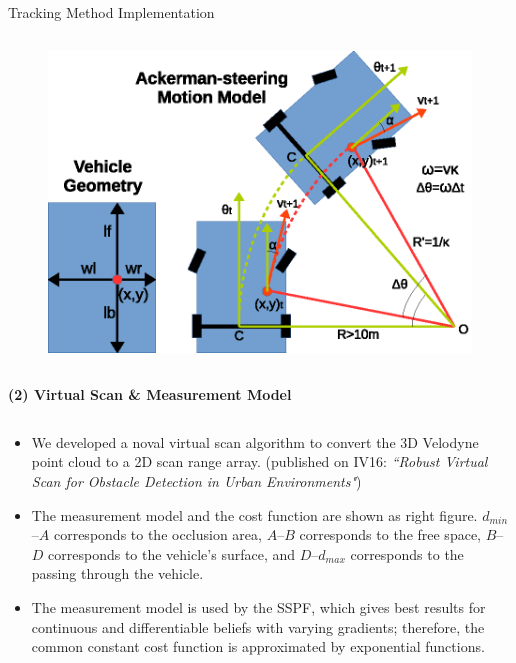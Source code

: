 \documentclass[final,hyperref={pdfpagelabels=false}]{beamer}
\begin{document}
\begin{frame}[t]
\begin{columns}[t]
\begin{column}{.48\textwidth}
\begin{block}{Tracking Method Implementation}
\begin{columns}[t]
\begin{column}{0.48\textwidth}
\begin{figure}
	 \includegraphics[width=\textwidth]{./img/geometry_ackerman}
	 \label{fig:geometry_ackerman}
	\end{figure}
	\end{column}
\end{columns}

\vspace{1em}
\begin{center}
\textbf{(2) Virtual Scan \& Measurement Model}
\end{center}
\begin{columns}[t]
	\begin{column}{0.53\textwidth}
		\begin{itemize}
			\item We developed a noval virtual scan algorithm to convert the 3D Velodyne point cloud to a 2D scan range array. (published on IV16: \textit{``Robust Virtual Scan for Obstacle Detection in Urban Environments"})
			\item The measurement model and the cost function are shown as right figure. $d_{min}$--$A$ corresponds to the occlusion area, $A$--$B$ corresponds to the free space, $B$--$D$ corresponds to the vehicle's surface, and $D$--$d_{max}$ corresponds to the passing through the vehicle.
			\item The measurement model is used by the SSPF, which gives best results for continuous and differentiable beliefs with varying gradients; therefore, the common constant cost function is approximated by exponential functions.
			

\end{itemize}
\end{column}
\end{columns}
\end{block}
\end{column}
\end{columns}
\end{frame}
\end{document}
